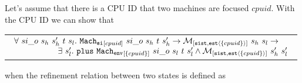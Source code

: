 \begin{lemma}
\label{lemma:chapter:conlink:one-step-single-refines-env}
Let's assume that there is a CPU ID that two machines are focused $cpuid$. With the CPU ID we can show that
\begin{center}
\begin{tabular}{P{0.95\textwidth}}
$
\begin{array}{l}
\forall \ si\_o \ s_h \ s_h' \ t \ s_l . \ \singlestep{cpuid}{si\_o}{s_h}{t}{s_h'} \rightarrow  \matchsinglestatestate{\set{cpuid}}{s_h}{s_l} \rightarrow \\
\ \ \ \ \ \ \ \ \ \ \ \ \ \ \ \ \exists\ s_l' . \  \ccplusstep{\envstep{\set{cpuid}}{si\_o}{s_l}{t}{s_l'}} \wedge  \matchsinglestatestate{\set{cpuid}}{s_h'}{s_l'}\\
\end{array}
$
\end{tabular}
\end{center}
when the refinement relation between two states is defined as
\begin{mathpar}
\end{mathpar}
\end{lemma}

